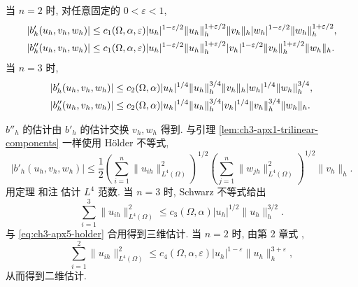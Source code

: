 \hypertarget{chapter-03-page-274}{}
\begin{Lemma}
\label{lem:ch3-apx5-trilinear-components}
当 $n=2$ 时, 对任意固定的 $0<\varepsilon<1$,
\begin{align}
|b'_h(u_h,v_h,w_h)|
&\leq c_1(\Omega,\alpha,\varepsilon)|u_h|^{1-\varepsilon/2}
\lVert u_h\rVert_h^{1+\varepsilon/2}\lVert v_h\rVert_h
|w_h|^{1-\varepsilon/2}\lVert w_h\rVert_h^{1+\varepsilon/2},\notag\\
|b''_h(u_h,v_h,w_h)|
&\leq c_1(\Omega,\alpha,\varepsilon)|u_h|^{1-\varepsilon/2}
\lVert u_h\rVert_h^{1+\varepsilon/2}|v_h|^{1-\varepsilon/2}
\lVert v_h\rVert_h^{1+\varepsilon/2}\lVert w_h\rVert_h.
\label{eq:ch3-apx5-trilinear-estimate-2d}
\end{align}
当 $n=3$ 时,
\begin{align}
|b'_h(u_h,v_h,w_h)|
&\leq c_2(\Omega,\alpha)|u_h|^{1/4}\lVert u_h\rVert_h^{3/4}
\lVert v_h\rVert_h|w_h|^{1/4}\lVert w_h\rVert_h^{3/4},\notag\\
|b''_h(u_h,v_h,w_h)|
&\leq c_2(\Omega,\alpha)|u_h|^{1/4}\lVert u_h\rVert_h^{3/4}
|v_h|^{1/4}\lVert v_h\rVert_h^{3/4}\lVert w_h\rVert_h.
\label{eq:ch3-apx5-trilinear-estimate-3d}
\end{align}
\end{Lemma}

\begin{Proof}
$b''_h$ 的估计由 $b'_h$ 的估计交换 $v_h,w_h$ 得到. 与引理 \ref{lem:ch3-apx1-trilinear-components} 一样使用 H\"older 不等式,
\begin{equation}
|b'_h(u_h,v_h,w_h)|\leq\frac12
\left(\sum_{i=1}^n\lVert u_{ih}\rVert_{L^4(\Omega)}^2\right)^{1/2}
\left(\sum_{j=1}^n\lVert w_{jh}\rVert_{L^4(\Omega)}^2\right)^{1/2}
\lVert v_h\rVert_h.
\label{eq:ch3-apx5-holder}
\end{equation}
用定理  和注  估计 $L^4$ 范数. 当 $n=3$ 时, Schwarz 不等式给出
\begin{equation}
\sum_{i=1}^3\lVert u_{ih}\rVert_{L^4(\Omega)}^2
\leq c_3(\Omega,\alpha)|u_h|^{1/2}\lVert u_h\rVert_h^{3/2}.
\label{eq:ch3-apx5-l4-bound-3d}
\end{equation}
与 \eqref{eq:ch3-apx5-holder} 合用得到三维估计. 当 $n=2$ 时, 由第 2 章式 ,
\begin{equation}
\sum_{i=1}^2\lVert u_{ih}\rVert_{L^4(\Omega)}^2
\leq c_4(\Omega,\alpha,\varepsilon)|u_h|^{1-\varepsilon}
\lVert u_h\rVert_h^{3+\varepsilon},
\label{eq:ch3-apx5-l4-bound-2d}
\end{equation}
从而得到二维估计.
\end{Proof}

